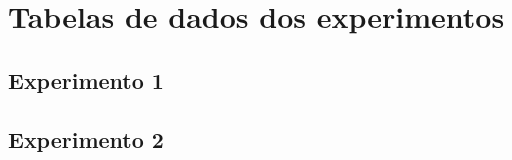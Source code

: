 \chapter{Tabelas de dados dos experimentos}
\label{chap:app_tabelas_de_dados_dos_experimentos}

\section{Experimento 1}
\label{sec:app_experimento_1}


\section{Experimento 2}
\label{sec:app_experimento_2}